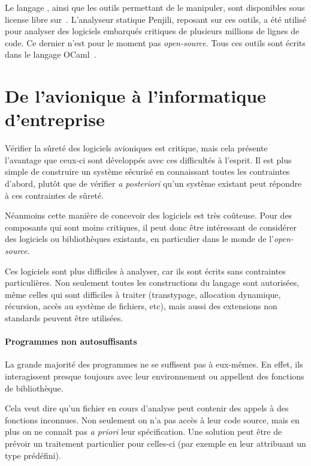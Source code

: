 Le langage \newspeak, ainsi que les outils permettant de le manipuler, sont
disponibles sous license libre sur~. L'analyseur statique Penjili,
reposant sur ces outils, a été utilisé pour analyser des logiciels embarqués
critiques de plusieurs millions de lignes de code. Ce dernier n'est pour le
moment pas \emph{open-source}. Tous ces outils sont écrits dans le langage
OCaml~\cite{ocamlManual,DAOC}.

\section{De l'avionique à l'informatique d'entreprise}

Vérifier la sûreté des logiciels avioniques est critique, mais cela présente
l'avantage que ceux-ci sont développés avec ces difficultés à l'esprit. Il est
plus simple de construire un système sécurisé en connaissant toutes les
contraintes d'abord, plutôt que de vérifier \emph{a posteriori} qu'un système
existant peut répondre à ces contraintes de sûreté.

Néanmoins cette manière de concevoir des logiciels est très coûteuse. Pour des
composants qui sont moins critiques, il peut donc être intéressant de considérer
des logiciels ou bibliothèques existants, en particulier dans le monde de
l'\emph{open-source}.

Ces logiciels sont plus difficiles à analyser, car ils sont écrits sans
contraintes particulières. Non seulement toutes les constructions du langage
sont autorisées, même celles qui sont difficiles à traiter (transtypage,
allocation dynamique, récursion, accès au système de fichiers, etc), mais aussi
des extensions non standards peuvent être utilisées.

\paragraph{Programmes non autosuffisants}

La grande majorité des programmes ne se suffisent pas à eux-mêmes. En effet, ils
interagissent presque toujours avec leur environnement ou appellent des
fonctions de bibliothèque.

Cela veut dire qu'un fichier en cours d'analyse peut contenir des appels à des
fonctions inconnues. Non seulement on n'a pas accès à leur code source, mais en
plus on ne connaît pas \emph{a priori} leur spécification. Une solution peut
être de prévoir un traitement particulier pour celles-ci (par exemple en leur
attribuant un type prédéfini).

